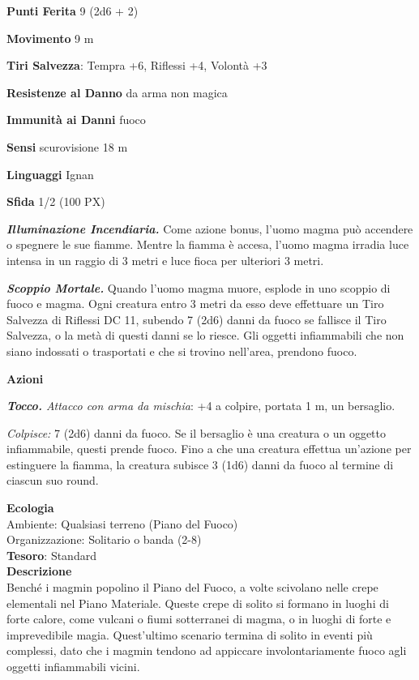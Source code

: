 \begin{multicols}{2}
\textbf{Punti Ferita} 9 (2d6 + 2)

\textbf{Movimento} 9 m

\textbf{Tiri Salvezza}: Tempra +6, Riflessi +4, Volontà +3

\textbf{Resistenze al Danno} da arma non magica

\textbf{Immunità ai Danni} fuoco

\textbf{Sensi} scurovisione 18 m

\textbf{Linguaggi} Ignan

\textbf{Sfida} 1/2 (100 PX)

\textit{\textbf{Illuminazione Incendiaria.}} Come azione bonus, l'uomo magma può accendere o spegnere le sue fiamme. Mentre la fiamma è accesa, l'uomo magma irradia luce intensa in un raggio di 3 metri e luce fioca per ulteriori 3 metri.

\textit{\textbf{Scoppio Mortale.}} Quando l'uomo magma muore, esplode in uno scoppio di fuoco e magma. Ogni creatura entro 3 metri da esso deve effettuare un Tiro Salvezza di Riflessi DC 11, subendo 7 (2d6) danni da fuoco se fallisce il Tiro Salvezza, o la metà di questi danni se lo riesce. Gli oggetti infiammabili che non siano indossati o trasportati e che si trovino nell'area, prendono fuoco.

\textbf{Azioni}

\textit{\textbf{Tocco.} Attacco con arma da mischia}: +4 a colpire, portata 1 m, un bersaglio.

\textit{Colpisce:} 7 (2d6) danni da fuoco. Se il bersaglio è una creatura o un oggetto infiammabile, questi prende fuoco. Fino a che una creatura effettua un'azione per estinguere la fiamma, la creatura subisce 3 (1d6) danni da fuoco al termine di ciascun suo round.

\textbf{Ecologia}\\
Ambiente: Qualsiasi terreno (Piano del Fuoco)\\
Organizzazione: Solitario o banda (2-8)\\
\textbf{Tesoro}: Standard\\
\textbf{Descrizione}\\
Benché i magmin popolino il Piano del Fuoco, a volte scivolano nelle crepe elementali nel Piano Materiale. Queste crepe di solito si formano in luoghi di forte calore, come vulcani o fiumi sotterranei di magma, o in luoghi di forte e imprevedibile magia. Quest'ultimo scenario termina di solito in eventi più complessi, dato che i magmin tendono ad appiccare involontariamente fuoco agli oggetti infiammabili vicini.


\end{multicols}
